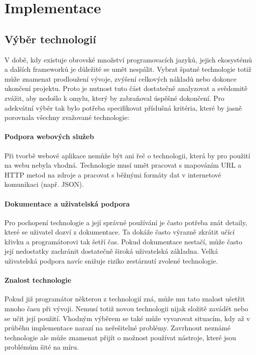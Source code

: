 \chapter{Implementace}

\section{Výběr technologií}

V době, kdy existuje obrovské množství programovacích jazyků, jejich ekosystémů a dalších frameworků je důležité se umět nespálit. 
Vybrat špatné technologie totiž může znamenat prodloužení vývoje, zvýšení celkových nákladů nebo dokonce ukončení projektu.
Proto je nutnost tuto část dostatečně analyzovat a svědomitě zvážit, aby nedošlo k omylu, který by zabraňoval úspěšné dokončení.
Pro adekvátní výběr tak bylo potřeba specifikovat příslušná kritéria, které by jasně porovnala všechny zvažované technologie:

\subsubsection*{Podpora webových služeb}
Při tvorbě webové aplikace nemůže být ani řeč o technologii, která by pro použití na webu nebyla vhodná. Technologie musí
umět pracovat s mapováním URL a HTTP metod na zdroje a pracovat s běžnými formáty dat v internetové komunikaci (např. JSON).

\subsubsection*{Dokumentace a uživatelská podpora}
Pro pochopení technologie a její správné používání je často potřeba znát detaily, které se uživatel dozví z dokumentace.
Ta dokáže často výrazně zkrátit učící křivku a programátorovi tak šetří čas. Pokud dokumentace nestačí, může často její
nedostatky zachránit dostatečně široká uživatelská základna. Velká uživatelská podpora navíc snižuje riziko zestárnutí zvolené technologie.

\subsubsection*{Znalost technologie}
Pokud již programátor některou z technologií zná, může mu tato znalost ušetřit mnoho času při vývoji. Nemusí totiž novou technologii
nijak složitě zavádět nebo se učit její použití. Vhodným výběrem se také může vyvarovat situacím, kdy až v průběhu implementace narazí
na neřešitelné problémy. Zavrhnout neznámé technologie ale může znamenat přijít o možnost používat nástroje, které jsou problémům šité na míru. 

